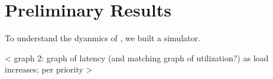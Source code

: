 \section{Preliminary Results}

To understand the dyanmics of \sys{}, we built a simulator. 

< graph 2: graph of latency (and matching graph of utilization?) as load increases; per priority >

